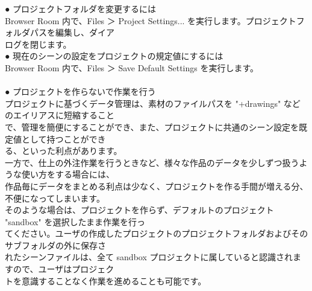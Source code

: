 \documentclass[a4paper,10pt]{article}
\begin{document}
\newpage

\noindent● プロジェクトフォルダを変更するには\\
\normalsize
Browser Room 内で、Files ＞ Project Settings... を実行します。プロジェクトフォルダパスを編集し、ダイア\\
ログを閉じます。\\
\large
● 現在のシーンの設定をプロジェクトの規定値にするには\\
\normalsize
Browser Room 内で、Files ＞ Save Default Settings を実行します。\\
\\[0.5em]
\large
● プロジェクトを作らないで作業を行う\\
\normalsize
プロジェクトに基づくデータ管理は、素材のファイルパスを "+drawings" などのエイリアスに短縮すること\\
で、管理を簡便にすることができ、また、プロジェクトに共通のシーン設定を既定値として持つことができ\\
る、といった利点があります。\\
一方で、仕上の外注作業を行うときなど、様々な作品のデータを少しずつ扱うような使い方をする場合には、\\
作品毎にデータをまとめる利点は少なく、プロジェクトを作る手間が増える分、不便になってしまいます。\\
そのような場合は、プロジェクトを作らず、デフォルトのプロジェクト "sandbox" を選択したまま作業を行っ\\
てください。ユーザの作成したプロジェクトのプロジェクトフォルダおよびそのサブフォルダの外に保存さ\\
れたシーンファイルは、全て sandbox プロジェクトに属していると認識されますので、ユーザはプロジェク\\
トを意識することなく作業を進めることも可能です。\\
\end{document}
